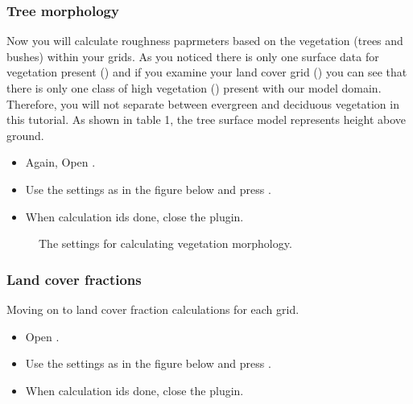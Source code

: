 \documentclass[letterpaper,10pt,english]{sphinxmanual}
\begin{document}
\subsubsection{Tree morphology}
\label{\detokenize{Tutorials/SuewsSpatial:tree-morphology}}
Now you will calculate roughness paprmeters based on the vegetation (trees and bushes) within your grids. As you noticed there is only one surface data for vegetation present () and if you examine your land cover grid () you can see that there is only one class of high vegetation () present with our model domain. Therefore, you will not separate between evergreen and deciduous vegetation in this tutorial. As shown in table 1, the tree surface model represents height above ground.
\begin{itemize}
\item {} 
Again, Open .

\item {} 
Use the settings as in the figure below and press .

\item {} 
When calculation ids done, close the plugin.

\end{itemize}

\begin{figure}[htbp]
\centering
\capstart

\noindent{}
\caption{The settings for calculating vegetation morphology.}\label{\detokenize{Tutorials/SuewsSpatial:id12}}\end{figure}


\subsubsection{Land cover fractions}
\label{\detokenize{Tutorials/SuewsSpatial:land-cover-fractions}}
Moving on to land cover fraction calculations for each grid.
\begin{itemize}
\item {} 
Open .

\item {} 
Use the settings as in the figure below and press .

\item {} 
When calculation ids done, close the plugin.

\end{itemize}
\end{document}
